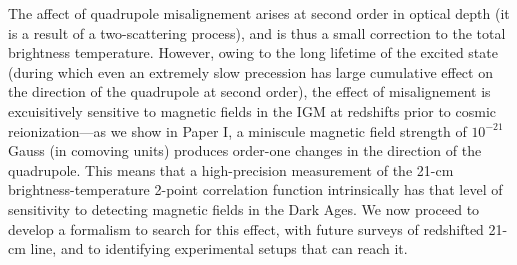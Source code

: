 The affect of quadrupole misalignement arises at second order in optical depth (it is a result of a two-scattering process), and is thus a small correction to the total brightness temperature. However, owing to the long lifetime of the excited state (during which even an extremely slow precession has large cumulative effect on the direction of the quadrupole at second order), the effect of misalignement is excuisitively sensitive to magnetic fields in the IGM at redshifts prior to cosmic reionization---as we show in Paper I, a miniscule magnetic field strength of  $10^{-21}$ Gauss (in comoving units) produces order-one changes in the direction of the quadrupole. This means that a high-precision measurement of the 21-cm brightness-temperature 2-point correlation function intrinsically has that level of sensitivity to detecting magnetic fields in the Dark Ages. We now proceed to develop a formalism to search for this effect, with future surveys of redshifted 21-cm line, and to identifying experimental setups that can reach it. 